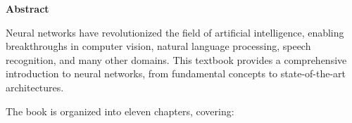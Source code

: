 % 
%
%

\newpage
\thispagestyle{empty}

\begin{center}
    \Large\textbf{Abstract}
\end{center}

\vspace{1cm}

Neural networks have revolutionized the field of artificial intelligence, enabling breakthroughs in computer vision, natural language processing, speech recognition, and many other domains. This textbook provides a comprehensive introduction to neural networks, from fundamental concepts to state-of-the-art architectures.

The book is organized into eleven chapters, covering:

